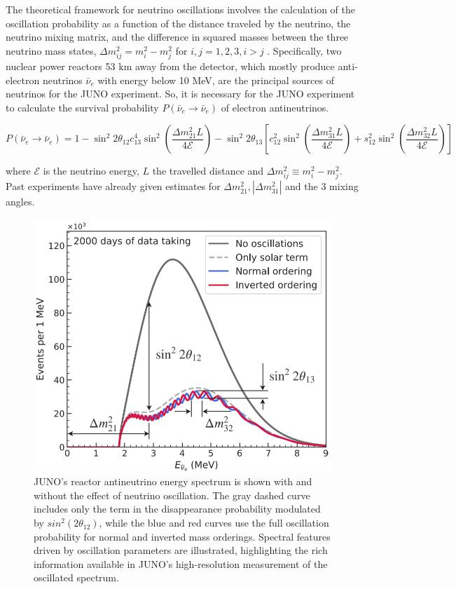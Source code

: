 The theoretical framework for neutrino oscillations involves the calculation of the oscillation probability as a function of the distance traveled by the neutrino, the neutrino mixing matrix, and the difference in squared masses between the three neutrino mass states, $\Delta m_{ij}^2 = m^2_i - m^2_j$ for $i,j = 1,2,3, i>j$ . Specifically, two nuclear power reactors 53 $\unit{\kilo\meter}$ away from the detector, which mostly produce anti-electron neutrinos $\bar{\nu}_e$ with energy below 10 MeV, are the principal sources of neutrinos for the JUNO experiment. So, it is necessary for the JUNO experiment to calculate the survival probability $P\left(\bar{\nu}_e \rightarrow \bar{\nu}_e\right)$ of electron antineutrinos.

\begin{equation*}
	P\left(\bar{\nu}_e \rightarrow \bar{\nu}_e\right)=1-\sin ^2 2 \theta_{12} c_{13}^4 \sin ^2\left(\frac{\Delta m_{21}^2 L}{4 \mathcal{E}}\right)-\sin ^2 2 \theta_{13}\left[c_{12}^2 \sin ^2\left(\frac{\Delta m_{31}^2 L}{4 \mathcal{E}}\right)+s_{12}^2 \sin ^2\left(\frac{\Delta m_{32}^2 L}{4 \mathcal{E}}\right)\right]
\end{equation*}

where $\mathcal{E}$ is the neutrino energy, $L$ the travelled distance and $\Delta m_{i j}^2 \equiv m_i^2-m_j^2$. \\
Past experiments have already given estimates for  $\Delta m_{21}^2,\left|\Delta m_{31}^2\right|$ and the  3 mixing angles.


\begin{figure}[h]
	\centering
	\includegraphics[width=0.4\linewidth]{Images/antineutino_to_antineutrino_probability_plot}
	\caption{JUNO's reactor antineutrino energy spectrum is shown with and without the effect of neutrino oscillation. The gray dashed curve includes only the term in the disappearance probability modulated by $sin^2(2\theta_{12})$, while the blue and red curves use the full oscillation probability for normal and inverted mass orderings. Spectral features driven by oscillation parameters are illustrated, highlighting the rich information available in JUNO's high-resolution measurement of the oscillated spectrum.}
	\label{fig:antineutinotoantineutrinoprobabilityplot}
\end{figure}


